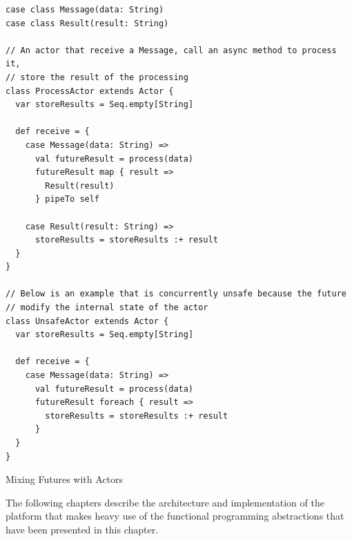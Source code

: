 \begin{listing}[h]
\begin{verbatim}
case class Message(data: String)
case class Result(result: String)

// An actor that receive a Message, call an async method to process it,
// store the result of the processing
class ProcessActor extends Actor {
  var storeResults = Seq.empty[String]

  def receive = {
    case Message(data: String) => 
      val futureResult = process(data)
      futureResult map { result =>
        Result(result)
      } pipeTo self

    case Result(result: String) =>
      storeResults = storeResults :+ result
  }
}

// Below is an example that is concurrently unsafe because the future 
// modify the internal state of the actor
class UnsafeActor extends Actor {
  var storeResults = Seq.empty[String]

  def receive = {
    case Message(data: String) => 
      val futureResult = process(data)
      futureResult foreach { result =>
        storeResults = storeResults :+ result
      }
  }
}
\end{verbatim}
\caption{Mixing Futures with Actors}
\label{lst:akkasafeunsafe}
\end{listing}

The following chapters describe the architecture and implementation of the platform that makes heavy use of the functional programming abstractions that have been 
presented in this chapter.


